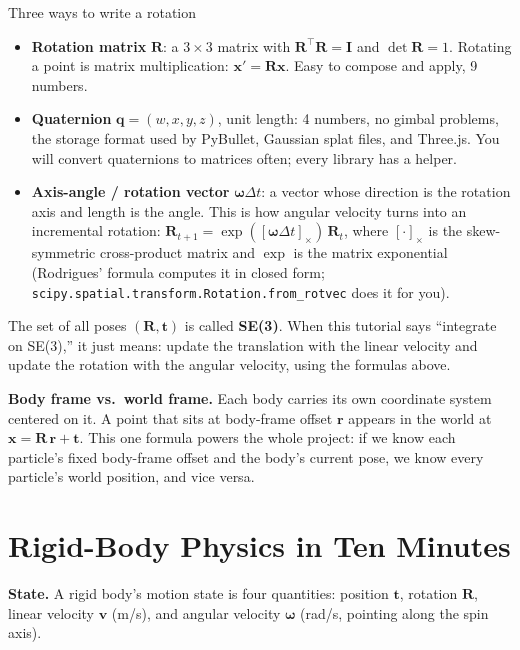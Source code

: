 \documentclass[11pt]{article}
\newcommand{\x}{\mathbf{x}}
\newcommand{\vv}{\mathbf{v}}
\newcommand{\R}{\mathbf{R}}
\newcommand{\tr}{\mathbf{t}}
\begin{document}
\begin{concept}{Three ways to write a rotation}
\begin{itemize}[itemsep=2pt]
  \item \textbf{Rotation matrix} $\R$: a $3\times3$ matrix with $\R^\top \R = \mathbf{I}$ and $\det \R = 1$. Rotating a point is matrix multiplication: $\x' = \R\x$. Easy to compose and apply, 9 numbers.
  \item \textbf{Quaternion} $\mathbf{q} = (w, x, y, z)$, unit length: 4 numbers, no gimbal problems, the storage format used by PyBullet, Gaussian splat files, and Three.js. You will convert quaternions to matrices often; every library has a helper.
  \item \textbf{Axis-angle / rotation vector} $\boldsymbol{\omega}\Delta t$: a vector whose direction is the rotation axis and length is the angle. This is how angular velocity turns into an incremental rotation: $\R_{t+1} = \exp([\boldsymbol{\omega}\Delta t]_\times)\,\R_t$, where $[\cdot]_\times$ is the skew-symmetric cross-product matrix and $\exp$ is the matrix exponential (Rodrigues' formula computes it in closed form; \texttt{scipy.spatial.transform.Rotation.from\_rotvec} does it for you).
\end{itemize}
\end{concept}

The set of all poses $(\R, \tr)$ is called \textbf{SE(3)}. When this tutorial says ``integrate on SE(3),'' it just means: update the translation with the linear velocity and update the rotation with the angular velocity, using the formulas above.

\textbf{Body frame vs.\ world frame.} Each body carries its own coordinate system centered on it. A point that sits at body-frame offset $\mathbf{r}$ appears in the world at $\x = \R\,\mathbf{r} + \tr$. This one formula powers the whole project: if we know each particle's fixed body-frame offset and the body's current pose, we know every particle's world position, and vice versa.

\section{Rigid-Body Physics in Ten Minutes}

\textbf{State.} A rigid body's motion state is four quantities: position $\tr$, rotation $\R$, linear velocity $\vv$ (m/s), and angular velocity $\boldsymbol{\omega}$ (rad/s, pointing along the spin axis).
\end{document}
